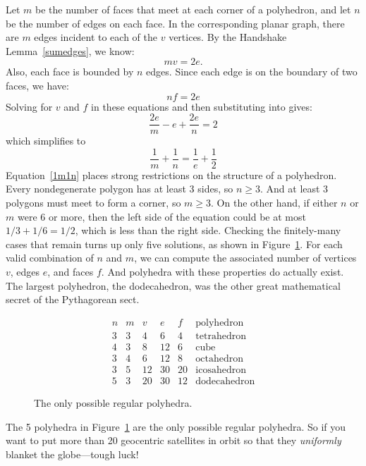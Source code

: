 Let $m$ be the number of faces that meet at each corner of a
polyhedron, and let $n$ be the number of edges on each face.  In the
corresponding planar graph, there are $m$ edges incident to each of
the $v$ vertices.  By the Handshake Lemma~\ref{sumedges}, we
know:
%
\[
m v = 2 e.
\]
%
Also, each face is bounded by $n$ edges.  Since each edge is on the
boundary of two faces, we have:
%
\[
n f = 2 e
\]
%
Solving for $v$ and $f$ in these equations and then substituting into
 gives:
\[
\frac{2e}{m} - e + \frac{2e}{n} = 2
\]
which simplifies to
\begin{equation}\label{1m1n}
\frac{1}{m} + \frac{1}{n} = \frac{1}{e} + \frac{1}{2}
\end{equation}
%
Equation~\ref{1m1n} places strong restrictions on the structure of a
polyhedron.  Every nondegenerate polygon has at least 3 sides, so $n
\geq 3$.  And at least 3 polygons must meet to form a corner, so $m
\geq 3$.  On the other hand, if either $n$ or $m$ were 6 or more, then
the left side of the equation could be at most $1/3 + 1/6 = 1/2$,
which is less than the right side.  Checking the finitely-many cases
that remain turns up only five solutions, as shown in
Figure~\ref{fig:5DR}.  For each valid combination of $n$ and $m$, we
can compute the associated number of vertices $v$, edges $e$, and
faces $f$.  And polyhedra with these properties do actually exist.
The largest polyhedron, the dodecahedron, was the other great
mathematical secret of the Pythagorean sect.

\begin{figure}

\[
\begin{array}{cc|ccc|l}
n & m & v  & e  &  f & \text{polyhedron} \\ \hline
3 & 3 & 4  & 6  &  4 & \text{tetrahedron} \\
4 & 3 & 8  & 12 &  6 & \text{cube} \\
3 & 4 & 6  & 12 &  8 & \text{octahedron} \\
3 & 5 & 12 & 30 & 20 & \text{icosahedron} \\
5 & 3 & 20 & 30 & 12 & \text{dodecahedron}
\end{array}
\]

\caption{The only possible regular polyhedra.}

\label{fig:5DR}

\end{figure}

The 5 polyhedra in Figure~\ref{fig:5DR} are the only possible regular
polyhedra.  So if you want to put more than 20 geocentric satellites
in orbit so that they \emph{uniformly} blanket the globe---tough luck!

